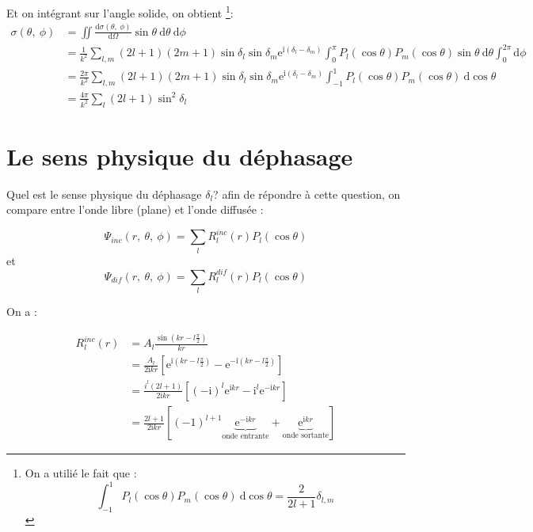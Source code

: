 \documentclass[12pt,a4paper,oneside,french]{book}
\renewcommand{\i}{\mathrm{i}}
\newcommand{\e}{\mathrm{e}}
\newcommand{\diff}{\mathrm{d}}
\theoremstyle{definition}
\theoremstyle{definition}
\theoremstyle{definition}
\theoremstyle{remark}
\theoremstyle{definition}
\begin{document}
    Et on intégrant sur l'angle solide, on obtient \footnote{On a utilié le fait que : 
        \begin{equation*}
            \int_{-1}^{1} \!\!\! {P}_{l}(\cos{\theta}) {P}_{m}(\cos{\theta}) \ \diff \cos{\theta} = \frac{2}{2l + 1} {\delta}_{l, m}
        \end{equation*}}:
    \begin{equation*}
    \begin{split}
        \sigma(\theta, \ \phi)
            &= \iint \frac{\diff \sigma(\theta, \ \phi)}{\diff \Omega} \sin{\theta} \ \diff \theta \ \diff \phi \\
            &= \frac{1}{{k}^{2}} \sum_{l, m} (2l + 1)(2m + 1) \sin{{\delta}_{l}} \sin{{\delta}_{m}} {\e}^{\i \left({\delta}_{l} - {\delta}_{m}\right)} \int_{0}^{\pi} \!\!\! {P}_{l}(\cos{\theta}) {P}_{m}(\cos{\theta}) \sin{\theta} \ \diff \theta \int_{0}^{2\pi} \!\!\!\! \diff \phi \\
            &= \frac{2\pi}{{k}^{2}} \sum_{l, m} (2l + 1)(2m + 1) \sin{{\delta}_{l}} \sin{{\delta}_{m}} {\e}^{\i \left({\delta}_{l} - {\delta}_{m}\right)} \int_{-1}^{1} \!\!\! {P}_{l}(\cos{\theta}) {P}_{m}(\cos{\theta}) \ \diff \cos{\theta} \\
            &= \frac{4\pi}{{k}^{2}} \sum_{l} (2l + 1) \sin^2 {{\delta}_{l}}
    \end{split}
    \end{equation*}
    
    \section{Le sens physique du déphasage}
    Quel est le sense physique du déphasage ${\delta}_{l}$? afin de répondre à cette question, on compare entre l'onde libre (plane) et l'onde diffusée :
    
    \begin{equation*}
        {\Psi}_{inc}(r, \ \theta, \ \phi) = \sum_{l} {R}_{l}^{inc}(r) {P}_{l}(\cos{\theta})
    \end{equation*}
    et
    \begin{equation*}
        {\Psi}_{dif}(r, \ \theta, \ \phi) = \sum_{l} {R}_{l}^{dif}(r) {P}_{l}(\cos{\theta})
    \end{equation*}
    
    On a :

    
    \begin{equation} \label{ch2eq/7}
    \begin{split}
        {R}_{l}^{inc}(r) 
            &= {A}_{l} \frac{\sin\left(k r - l \frac{\pi}{2}\right)}{k r} \\
            &= \frac{{A}_{l}}{2 \i k r} \left[{\e}^{\i \left(k r - l \frac{\pi}{2}\right)} - {\e}^{-\i \left(k r - l \frac{\pi}{2}\right)}\right] \\
            &= \frac{{i}^{l} (2l + 1)}{2 \i k r} \left[{(-\i)}^{l} {\e}^{\i k r} - {\i}^{l} {\e}^{-\i k r}\right] \\
            &= \frac{2l + 1}{2 \i k r} \left[{(-1)}^{l + 1} \underbrace{{\e}^{-\i k r}}_{\text{onde entrante}} + \underbrace{{\e}^{\i k r}}_{\text{onde sortante}}\right]
    \end{split}
    \end{equation}
    
\end{document}
